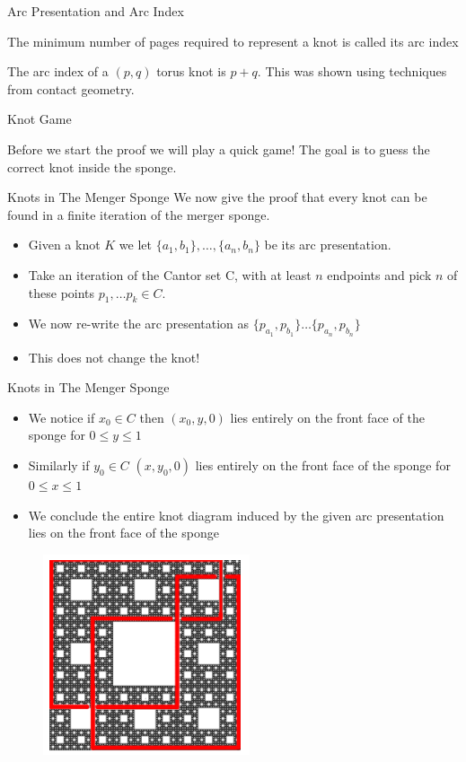 \begin{frame}{Arc Presentation and Arc Index}
\vspace{20px}
\begin{definition}
    The minimum number of pages required to represent a knot is called its arc index
\end{definition}

\begin{example}
    The arc index of a $(p,q)$ torus knot is $p+q$. This was shown using techniques from contact geometry.
\end{example}
\end{frame}

\begin{frame}[c]{Knot Game}
\begin{center}
    Before we start the proof we will play a quick game!
    The goal is to guess the correct knot inside the sponge.
\end{center}


\end{frame}

\begin{frame}[c]{Knots in The Menger Sponge}
We now give the proof that every knot can be found in a finite iteration of the merger sponge.
\begin{itemize}
    \item Given a knot $K$ we let $\{a_1, b_1\}, \dots, \{a_n, b_n\}$ be its arc presentation.
    \item Take an iteration of the Cantor set C, with at least $n$ endpoints and pick $n$ of these points $p_1, \dots p_k \in C$.
    \item We now re-write the arc presentation as $\{p_{a_1}, p_{b_1}\} \dots \{p_{a_n}, p_{b_n}\}$
    \item This does not change the knot!
\end{itemize}
\end{frame}

\begin{frame}[c]{Knots in The Menger Sponge}
\begin{itemize}
    \item We notice if $x_0 \in C$ then $(x_0, y,0)$ lies entirely on the front face of the sponge for $0 \leq y \leq 1$
    \item Similarly if $y_0 \in C$ $(x, y_0,0)$ lies entirely on the front face of the sponge for $0 \leq x \leq 1$
    \item We conclude the entire knot diagram induced by the given arc presentation lies on the front face of the sponge
\end{itemize}

\begin{figure}
    \centering
    \includegraphics[width=0.2\linewidth]{KnotOnFace.png}
    \caption{\cite{broden2024knotsinsidefractals}}
    \label{fig:enter-label}
\end{figure}
\end{frame}

